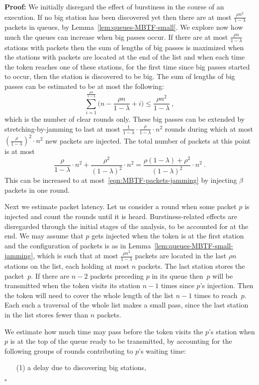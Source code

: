 \documentclass[11pt]{article}
\newcommand{\qed}{\hfill $\square$}
\newenvironment{proof}{\noindent\textbf{Proof: }}{\qed \smallbreak}
\begin{document}
\begin{proof}
We initially disregard the effect of burstiness in the course of an execution.
If no big station has been discovered yet then there are at most  $\frac{\rho n^2}{1-\lambda}$ packets in queues, by Lemma~\ref{lem:queues-MBTF-small}.
We explore now how much the queues can increase when big passes occur.
If there are at most $\frac{\rho n}{1-\lambda}$ stations with packets then the sum of lengths of big passes is maximized when the stations with packets are located at the end of the list and when each time the token reaches one of these stations, for the first time since big passes started to occur, then the station is discovered to be big.
The sum of lengths of big passes can be estimated to be at most the following:
\[
\sum_{i=1}^{\frac{\rho n}{1-\lambda}} \bigl(n-\frac{\rho n}{1-\lambda}+i\bigr)
\le
\frac{\rho n^2}{1-\lambda} 
 \ ,
\]
which is the number of clear rounds only.
These big passes can be extended by stretching-by-jamming to last at most $\frac{1}{1-\lambda}\cdot \frac{\rho}{1-\lambda}\cdot n^2$ rounds during which at most $ (\frac{\rho}{1-\lambda})^2\cdot n^2$ new packets are injected. 
The total number of packets at this point is at most
\[
\frac{\rho }{1-\lambda} \cdot n^2 + \frac{\rho^2 }{(1-\lambda)^2} \cdot n^2
=
\frac{\rho(1-\lambda)+\rho^2 }{(1-\lambda)^2} \cdot n^2
\ .
\]
This can be increased to at most~\eqref{eqn:MBTF-packets-jamming} by injecting $\beta$ packets in one round. 

Next we estimate packet latency.
Let us consider a round when some packet $p$ is injected and count the rounds until it is heard.
Burstiness-related effects are disregarded through the initial stages of the analysis, to be accounted for at the end.
We may assume that $p$ gets injected when the token is at the first station and the configuration of packets is as in Lemma~\ref{lem:queues-MBTF-small-jamming}, which is such that at most $\frac{\rho  n^2}{1-\lambda} $ packets are located  in the last $\rho  n$ stations on the list, each holding at most  $n$ packets.
The last station stores the  packet~$p$.
If there are $n-2$ packets preceding $p$ in its queue then~$p$ will be transmitted when the token visits its station  $n-1$ times since $p$'s  injection.
Then the token will need to cover the whole length of the list $n-1$ times to reach~$p$.
Each such a traversal of the whole list makes a small pass, since the last station in the list stores fewer than $n$ packets. 

We estimate how much time may pass before the token visits the $p$'s station when $p$ is at the top of the queue ready to be transmitted, by accounting for the following groups of rounds contributing to $p$'s waiting time: 
\begin{enumerate}
\item[(1)] a delay due to discovering big stations, 


\end{enumerate}
\end{proof}
\end{document}
